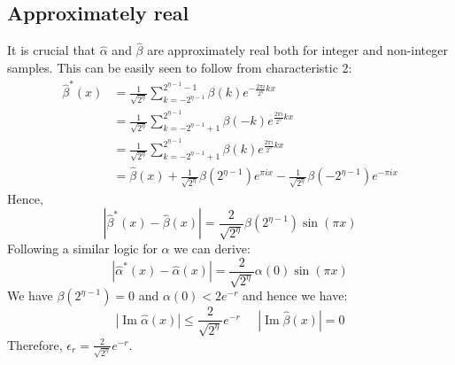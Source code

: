 \documentclass[aps,floatfix,10pt,amssymb,amsfont,amsmath,superscriptaddress,float,nofootinbib,longbibliography,nobalancelastpage,twocolumn]{revtex4-2}
\begin{document}
\subsection{Approximately real}
\label{section:approxiamtely_real}
It is crucial that $\hat \alpha$ and $\hat \beta$ are approximately real both for integer and non-integer samples. This can be easily seen to follow from characteristic 2:
\begin{align}
    \hat\beta^*(x) &=\frac{1}{\sqrt{2^{\eta}}}\sum_{k=-2^{\eta-1}}^{2^{\eta-1}-1} \beta(k)e^{-\frac{2\pi i}{2^{\eta}}kx}\\
    &=\frac{1}{\sqrt{2^{\eta}}}\sum_{k=-2^{\eta-1}+1}^{2^{\eta-1}} \beta(-k)e^{\frac{2\pi i}{2^{\eta}}kx}\\
    &=\frac{1}{\sqrt{2^{\eta}}}\sum_{k=-2^{\eta-1}+1}^{2^{\eta-1}} \beta(k)e^{\frac{2\pi i}{2^{\eta}}kx}\\
    &=\hat \beta(x) + \frac{1}{\sqrt{2^{\eta}}}\beta(2^{\eta-1})e^{\pi i x} - \frac{1}{\sqrt{2^{\eta}}}\beta(-2^{\eta-1})e^{-\pi i x}
\end{align}
Hence,
\begin{equation}
    |\hat\beta^*(x)- \hat\beta(x)| =  \frac{2}{\sqrt{2^{\eta}}}\beta(2^{\eta-1})\sin (\pi x)
\end{equation}
Following a similar logic for $\alpha$ we can derive:
\begin{equation}
        |\hat\alpha^*(x)- \hat\alpha(x)| =  \frac{2}{\sqrt{2^{\eta}}}\alpha(0)\sin (\pi x)
\end{equation}
We have $\beta(2^{\eta-1}) =0$ and $\alpha(0) < 2e^{-r}$ and hence we have:
\begin{equation}
    \label{eq:imagscaling}|\operatorname{Im}\hat\alpha(x)| \leq \frac{2}{\sqrt{2^{\eta}}}e^{-r} \;\;\;\;\;|\operatorname{Im}\hat\beta(x)| = 0
\end{equation}
Therefore, $\epsilon_r = \frac{2}{\sqrt{2^{\eta}}}e^{-r}$.
\end{document}
